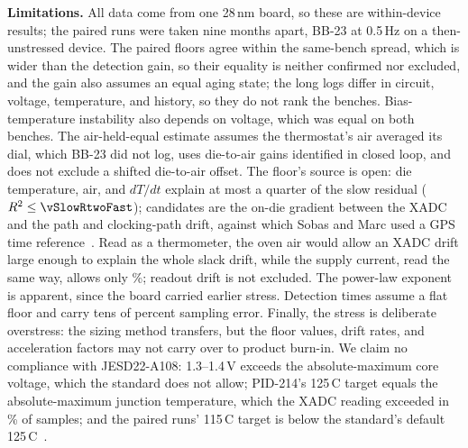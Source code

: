 \documentclass[10pt,twocolumn]{article}
\newcommand{\degC}{\,\textdegree C}
\begin{document}
\textbf{Limitations.} All data come from one 28\,nm board, so these are within-device results; the paired runs were taken nine months apart, BB-23 at 0.5\,Hz on a then-unstressed device. The paired floors agree within the same-bench spread, which is wider than the detection gain, so their equality is neither confirmed nor excluded, and the gain also assumes an equal aging state; the long logs differ in circuit, voltage, temperature, and history, so they do not rank the benches. Bias-temperature instability also depends on voltage, which was equal on both benches. The air-held-equal estimate assumes the thermostat's air averaged its dial, which BB-23 did not log, uses die-to-air gains identified in closed loop, and does not exclude a shifted die-to-air offset. The floor's source is open: die temperature, air, and $dT/dt$ explain at most a quarter of the slow residual ($R^2\le\vSlowRtwoFast$); candidates are the on-die gradient between the XADC and the path and clocking-path drift, against which Sobas and Marc used a GPS time reference~\cite{sobas}. Read as a thermometer, the oven air would allow an XADC drift large enough to explain the whole slack drift, while the supply current, read the same way, allows only \vThermoShare\%; readout drift is not excluded. The power-law exponent is apparent, since the board carried earlier stress. Detection times assume a flat floor and carry tens of percent sampling error. Finally, the stress is deliberate overstress: the sizing method transfers, but the floor values, drift rates, and acceleration factors may not carry over to product burn-in. We claim no compliance with JESD22-A108: 1.3--1.4\,V exceeds the absolute-maximum core voltage, which the standard does not allow; PID-214's 125\degC{} target equals the absolute-maximum junction temperature, which the XADC reading exceeded in \vTjAbovePct\% of samples; and the paired runs' 115\degC{} target is below the standard's default 125\degC~\cite{jedec}.

\end{document}
